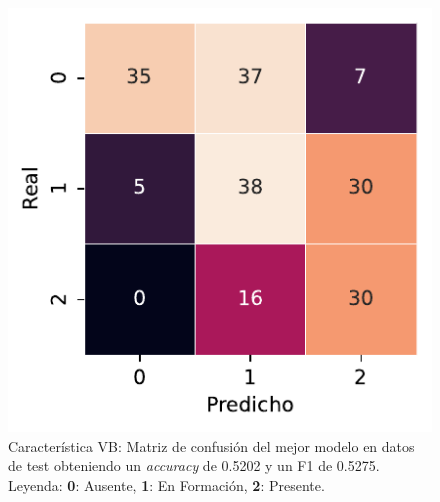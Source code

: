 \begin{figure}[htbp]
    \vspace{1.5em} %

    \includegraphics[width=0.6\linewidth]{figures/5_experiments/single-vb-cm.pdf}
    \caption[Característica VB: Matriz de confusión del mejor modelo en datos de test.]{Característica VB: Matriz de confusión del mejor modelo en datos de test obteniendo un \textit{accuracy} de 0.5202 y un F1 de 0.5275. Leyenda: \textbf{0}: Ausente, \textbf{1}: En Formación, \textbf{2}: Presente.}
    \label{fig5:VB_confusion_matrix}
\end{figure}

